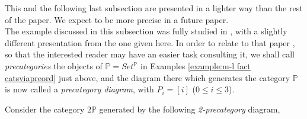\documentclass[12pt,a4paper]{amsart}
\theoremstyle{definition}
\begin{document}
This and the following last subsection are presented in a lighter way than the rest of the paper. We expect to be more precise in a future paper.\\

The example discussed in this subsection was fully studied in \cite{X:2ml}, with a slightly different presentation from the one given here. In order to relate to that paper \cite{X:2ml}, so that the interested reader may have an easier task consulting it, we shall call \emph{precategories} the objects of $\hat{\mathbb{P}}=Set^\mathbb{P}$ in Examples \ref{example:m-l fact catsviapreord} just above, and the diagram there which generates the category $\mathbb{P}$ is now called a \emph{precategory diagram}, with $P_i=[i]$ ($0\leq i\leq 3$).

Consider the category $2\mathbb{P}$ generated by the following \emph{2-precategory} diagram,

\end{document}
